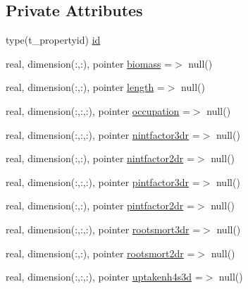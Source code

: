 \subsection*{Private Attributes}
\begin{DoxyCompactItemize}
\item 
type(t\+\_\+propertyid) \mbox{\hyperlink{structmodulesedimentproperties_1_1t__seagrassesroots_aca7b2d03134d8ff73f9d42b690fcd569}{id}}
\item 
real, dimension(\+:,\+:), pointer \mbox{\hyperlink{structmodulesedimentproperties_1_1t__seagrassesroots_a626a43a5fc19ea46200cfb262d8768a7}{biomass}} =$>$ null()
\item 
real, dimension(\+:,\+:), pointer \mbox{\hyperlink{structmodulesedimentproperties_1_1t__seagrassesroots_a6f77b659f9be741479e8dd0297d045ae}{length}} =$>$ null()
\item 
real, dimension(\+:,\+:,\+:), pointer \mbox{\hyperlink{structmodulesedimentproperties_1_1t__seagrassesroots_a46754c8b3495ea3685a27b4c415df5f4}{occupation}} =$>$ null()
\item 
real, dimension(\+:,\+:,\+:), pointer \mbox{\hyperlink{structmodulesedimentproperties_1_1t__seagrassesroots_af58e639467d353b093efe2688624f201}{nintfactor3dr}} =$>$ null()
\item 
real, dimension(\+:,\+:), pointer \mbox{\hyperlink{structmodulesedimentproperties_1_1t__seagrassesroots_a3a939702a003cba3d2312bbb3c8c0ca9}{nintfactor2dr}} =$>$ null()
\item 
real, dimension(\+:,\+:,\+:), pointer \mbox{\hyperlink{structmodulesedimentproperties_1_1t__seagrassesroots_a863ec758877e0ce5498d481ccae2ff77}{pintfactor3dr}} =$>$ null()
\item 
real, dimension(\+:,\+:), pointer \mbox{\hyperlink{structmodulesedimentproperties_1_1t__seagrassesroots_a68b5ba6f4e39679ab35f044457e5c13d}{pintfactor2dr}} =$>$ null()
\item 
real, dimension(\+:,\+:,\+:), pointer \mbox{\hyperlink{structmodulesedimentproperties_1_1t__seagrassesroots_a12de7ad06970bc565e4ec56b4d5921d8}{rootsmort3dr}} =$>$ null()
\item 
real, dimension(\+:,\+:), pointer \mbox{\hyperlink{structmodulesedimentproperties_1_1t__seagrassesroots_aa6c6bdfd709e862a3d115c5588655c07}{rootsmort2dr}} =$>$ null()
\item 
real, dimension(\+:,\+:,\+:), pointer \mbox{\hyperlink{structmodulesedimentproperties_1_1t__seagrassesroots_a2aaaaab901fcebf65ed0e1df59d1106b}{uptakenh4s3d}} =$>$ null()
\item 

\end{DoxyCompactItemize}
